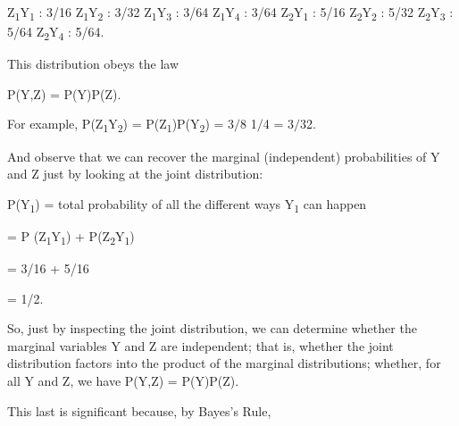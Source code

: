 {\centering
 Z\textsubscript{1}Y\textsubscript{1} : 3/16\newline
 Z\textsubscript{1}Y\textsubscript{2} : 3/32\newline
 Z\textsubscript{1}Y\textsubscript{3} : 3/64\newline
 Z\textsubscript{1}Y\textsubscript{4} : 3/64\newline
 Z\textsubscript{2}Y\textsubscript{1} : 5/16\newline
 Z\textsubscript{2}Y\textsubscript{2} : 5/32\newline
 Z\textsubscript{2}Y\textsubscript{3} : 5/64\newline
 Z\textsubscript{2}Y\textsubscript{4} : 5/64.
\par}


\bigskip

{
 This distribution obeys the law}

{\centering
 P(Y,Z) = P(Y)P(Z).
\par}


\bigskip

{
 For example, P(Z\textsubscript{1}Y\textsubscript{2}) =
P(Z\textsubscript{1})P(Y\textsubscript{2}) = 3$/$8 {\texttimes} 1$/$4 =
3$/$32. }

{
 And observe that we can recover the marginal (independent)
probabilities of Y and Z just by looking at the joint distribution:}

{\centering
 P(Y\textsubscript{1}) = total probability of all the different
ways Y\textsubscript{1} can happen
\par}


\bigskip

{\centering
 = P (Z\textsubscript{1}Y\textsubscript{1}) +
P(Z\textsubscript{2}Y\textsubscript{1})
\par}


\bigskip

{\centering
 = 3/16 + 5/16
\par}


\bigskip

{\centering
 = 1/2.
\par}


\bigskip

{
 So, just by inspecting the joint distribution, we can determine
whether the marginal variables Y and Z are independent; that is,
whether the joint distribution factors into the product of the marginal
distributions; whether, for all Y and Z, we have P(Y,Z) = P(Y)P(Z).}

{
 This last is significant because, by Bayes's
Rule,}

